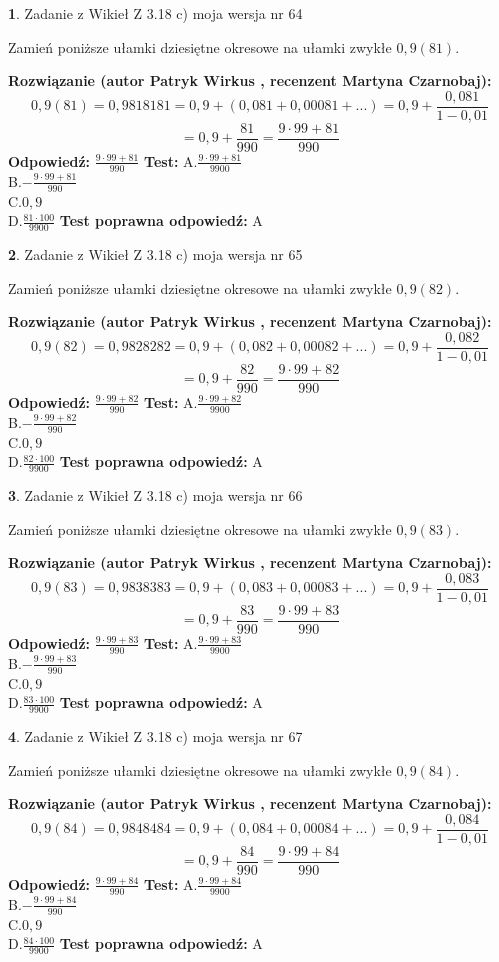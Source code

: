\documentclass[12pt, a4paper]{article}
\theoremstyle{definition} %
\newtheorem{zad}{}
\newcommand{\zadStart}[1]{\begin{zad}#1\newline}
\newcommand{\zadStop}{\end{zad}}
\newcommand{\rozwStart}[2]{\noindent \textbf{Rozwiązanie (autor #1 , recenzent #2): }\newline}
\newcommand{\rozwStop}{\newline}
\newcommand{\odpStart}{\noindent \textbf{Odpowiedź:}\newline}
\newcommand{\odpStop}{\newline}
\newcommand{\testStart}{\noindent \textbf{Test:}\newline}
\newcommand{\testStop}{\newline}
\newcommand{\kluczStart}{\noindent \textbf{Test poprawna odpowiedź:}\newline}
\newcommand{\kluczStop}{\newline}
\begin{document}
\zadStart{Zadanie z Wikieł Z 3.18 c) moja wersja nr 64}

Zamień poniższe ułamki dziesiętne okresowe na ułamki zwykłe $0,9(81)$.
\zadStop
\rozwStart{Patryk Wirkus}{Martyna Czarnobaj}
$$0,9(81)=0,9818181=0,9+(0,081+0,00081+...)=0,9+\frac{0,081}{1-0,01}$$
$$=0,9+\frac{81}{990}=\frac{9\cdot99+81}{990}$$
\rozwStop
\odpStart
$\frac{9\cdot99+81}{990}$
\odpStop
\testStart
A.$\frac{9\cdot99+81}{9900}$\\ B.$-\frac{9\cdot99+81}{990}$\\ C.$0,9$\\ D.$\frac{81\cdot100}{9900}$
\testStop
\kluczStart
A
\kluczStop



\zadStart{Zadanie z Wikieł Z 3.18 c) moja wersja nr 65}

Zamień poniższe ułamki dziesiętne okresowe na ułamki zwykłe $0,9(82)$.
\zadStop
\rozwStart{Patryk Wirkus}{Martyna Czarnobaj}
$$0,9(82)=0,9828282=0,9+(0,082+0,00082+...)=0,9+\frac{0,082}{1-0,01}$$
$$=0,9+\frac{82}{990}=\frac{9\cdot99+82}{990}$$
\rozwStop
\odpStart
$\frac{9\cdot99+82}{990}$
\odpStop
\testStart
A.$\frac{9\cdot99+82}{9900}$\\ B.$-\frac{9\cdot99+82}{990}$\\ C.$0,9$\\ D.$\frac{82\cdot100}{9900}$
\testStop
\kluczStart
A
\kluczStop



\zadStart{Zadanie z Wikieł Z 3.18 c) moja wersja nr 66}

Zamień poniższe ułamki dziesiętne okresowe na ułamki zwykłe $0,9(83)$.
\zadStop
\rozwStart{Patryk Wirkus}{Martyna Czarnobaj}
$$0,9(83)=0,9838383=0,9+(0,083+0,00083+...)=0,9+\frac{0,083}{1-0,01}$$
$$=0,9+\frac{83}{990}=\frac{9\cdot99+83}{990}$$
\rozwStop
\odpStart
$\frac{9\cdot99+83}{990}$
\odpStop
\testStart
A.$\frac{9\cdot99+83}{9900}$\\ B.$-\frac{9\cdot99+83}{990}$\\ C.$0,9$\\ D.$\frac{83\cdot100}{9900}$
\testStop
\kluczStart
A
\kluczStop



\zadStart{Zadanie z Wikieł Z 3.18 c) moja wersja nr 67}

Zamień poniższe ułamki dziesiętne okresowe na ułamki zwykłe $0,9(84)$.
\zadStop
\rozwStart{Patryk Wirkus}{Martyna Czarnobaj}
$$0,9(84)=0,9848484=0,9+(0,084+0,00084+...)=0,9+\frac{0,084}{1-0,01}$$
$$=0,9+\frac{84}{990}=\frac{9\cdot99+84}{990}$$
\rozwStop
\odpStart
$\frac{9\cdot99+84}{990}$
\odpStop
\testStart
A.$\frac{9\cdot99+84}{9900}$\\ B.$-\frac{9\cdot99+84}{990}$\\ C.$0,9$\\ D.$\frac{84\cdot100}{9900}$
\testStop
\kluczStart
A
\kluczStop
\end{document}
